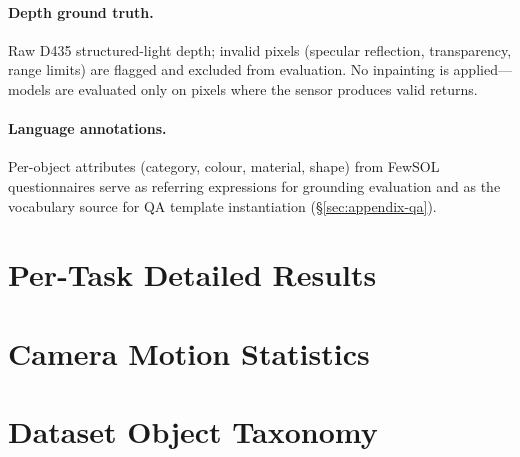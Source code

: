 \paragraph{Depth ground truth.}
Raw D435 structured-light depth; invalid pixels (specular reflection, transparency, range limits) are flagged and excluded from evaluation.
No inpainting is applied---models are evaluated only on pixels where the sensor produces valid returns.

\paragraph{Language annotations.}
Per-object attributes (category, colour, material, shape) from FewSOL~\citep{padalunkal2023fewsol} questionnaires serve as referring expressions for grounding evaluation and as the vocabulary source for QA template instantiation (\S\ref{sec:appendix-qa}).


\section{Per-Task Detailed Results}
\label{sec:appendix-per-task}



\section{Camera Motion Statistics}
\label{sec:appendix-motion}



\section{Dataset Object Taxonomy}
\label{sec:appendix-objects}



